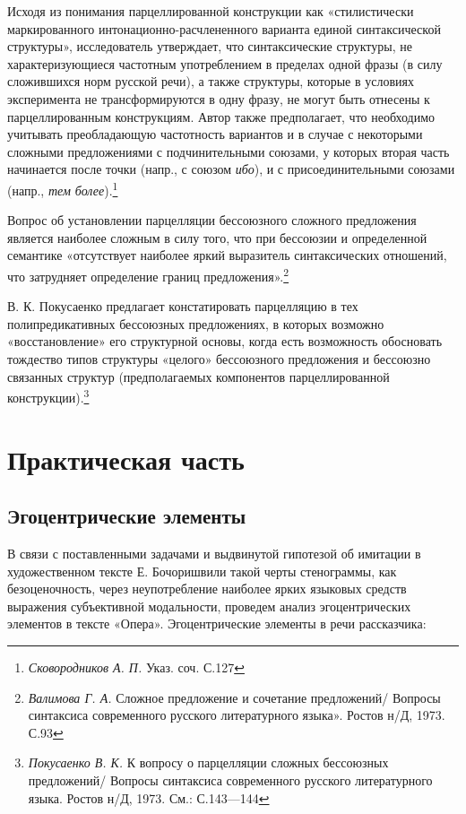 \documentclass{kursa4}
\begin{document}
      {Исходя из понимания парцеллированной конструкции как «стилистически маркированного интонационно-расчлененного варианта единой синтаксической структуры», исследователь утверждает, что синтаксические структуры, не характеризующиеся частотным употреблением в пределах одной фразы (в силу сложившихся норм русской речи), а также структуры, которые в условиях эксперимента не трансформируются в одну фразу, не могут быть отнесены к парцеллированным конструкциям. Автор также предполагает, что необходимо учитывать преобладающую частотность вариантов и в случае с некоторыми сложными предложениями с подчинительными союзами, у которых вторая часть начинается после точки (напр., с союзом }\textit{{ибо}}{), и с присоединительными союзами (напр., }\textit{{тем более}}{).}\footnote{\textit{{ Сковородников А. П. }}{Указ. соч. С.127}}

      {Вопрос об установлении парцелляции бессоюзного сложного предложения является наиболее сложным в силу того, что при бессоюзии и определенной семантике «отсутствует наиболее яркий выразитель синтаксических отношений, что затрудняет определение границ предложения».}\footnote{{ }\textit{{Валимова Г. А. }}{Сложное предложение и сочетание предложений/ Вопросы синтаксиса современного русского литературного языка». Ростов н/Д, 1973. С.93}}

      {В. К. Покусаенко предлагает констатировать парцелляцию в тех полипредикативных бессоюзных предложениях, в которых возможно «восстановление» его структурной основы, когда есть возможность обосновать тождество типов структуры «целого» бессоюзного предложения и бессоюзно связанных структур (предполагаемых компонентов парцеллированной конструкции).}\footnote{{ }\textit{{Покусаенко В. К. }}{К вопросу о парцелляции сложных бессоюзных предложений/ Вопросы синтаксиса современного русского литературного языка. Ростов н/Д, 1973. См.: С.143—144}}

  \chapter{Практическая часть}

    \section{Эгоцентрические элементы}

      В связи с поставленными задачами и выдвинутой гипотезой об имитации в художественном тексте Е. Бочоришвили такой черты стенограммы, как безоценочность, через неупотребление наиболее ярких языковых средств выражения субъективной модальности, проведем анализ эгоцентрических элементов в тексте «Опера». Эгоцентрические элементы в речи рассказчика:
\end{document}
